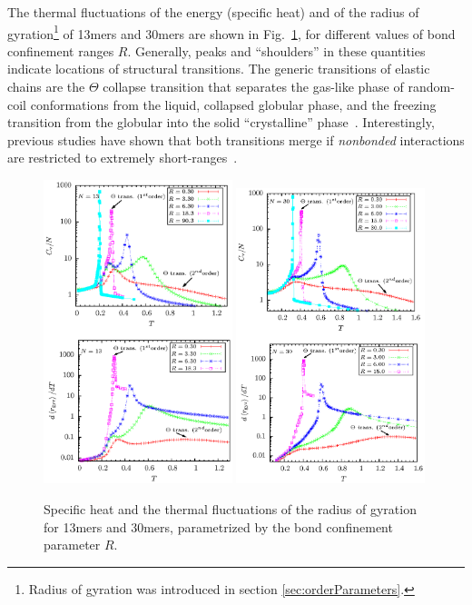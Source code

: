 \documentclass[12pt]{report}
\begin{document}
The thermal fluctuations of the energy (specific heat) and of the radius of gyration\footnote{Radius of gyration was introduced in section\,\,\ref{sec:orderParameters}.} of 13mers and 30mers are shown in Fig.~\ref{fig:ElasPolyCanonicalResults}, for different values of bond confinement ranges $R$. Generally, peaks and ``shoulders'' in these quantities indicate locations of structural transitions. The generic transitions of elastic chains are the $\Theta$ collapse transition that separates the gas-like phase of random-coil conformations from the liquid, collapsed globular phase, and the freezing transition from the globular into the solid ``crystalline'' phase~\cite{svbj1,Schnabel2009}. Interestingly, previous studies have shown that both transitions merge if \emph{nonbonded} interactions are restricted to extremely short-ranges~\cite{taylorRange1,taylorRange2,Gross2013}. 
%
\begin{figure}
\center
\includegraphics[width = 0.49\textwidth]{chapter5Figs/canon13.eps}
\includegraphics[width = 0.49\textwidth]{chapter5Figs/canon30.eps}
\caption{\label{fig:ElasPolyCanonicalResults}%
Specific heat and the thermal fluctuations of the radius of gyration for 13mers and 30mers, parametrized by the bond confinement parameter $R$.}
\end{figure} 
\end{document}
